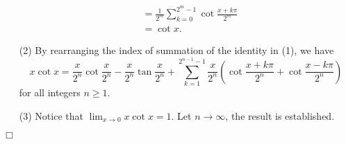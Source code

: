\documentclass{article}
\begin{document}
\begin{enumerate}
\begin{align*}
&= \frac{1}{2^{m}} \sum_{k=0}^{2^{m} - 1} \cot \frac{x + k\pi}{2^{m}} \\
&= \cot x.
\end{align*}
\item[(2)]
By rearranging the index of summation of the identity in (1), we have
$$x \cot x
= \frac{x}{2^n} \cot \frac{x}{2^n} - \frac{x}{2^n} \tan \frac{x}{2^n}
+ \sum_{k=1}^{2^{n-1} - 1} \frac{x}{2^n}
\left( \cot \frac{x + k\pi}{2^n} + \cot \frac{x - k\pi}{2^n} \right)$$
for all integers $n \geq 1$.
\item[(3)]
Notice that $\lim_{x \rightarrow 0} x \cot x = 1$.
Let $n \rightarrow \infty$, the result is established.
\end{enumerate}
$\Box$ \\\\
\end{document}
